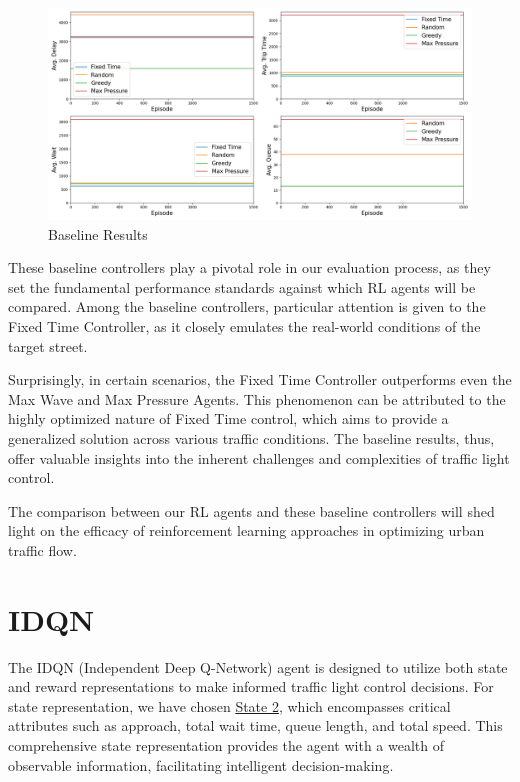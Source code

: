 \begin{figure}[h]
    \centering
    \includegraphics[width=1\linewidth]{images/experiments/baseline.png}
    \caption{Baseline Results}
    \label{fig:baseline_results}
\end{figure}

These baseline controllers play a pivotal role in our evaluation process, as they set the fundamental performance standards against which RL agents will be compared. Among the baseline controllers, particular attention is given to the Fixed Time Controller, as it closely emulates the real-world conditions of the target street.

Surprisingly, in certain scenarios, the Fixed Time Controller outperforms even the Max Wave and Max Pressure Agents. This phenomenon can be attributed to the highly optimized nature of Fixed Time control, which aims to provide a generalized solution across various traffic conditions. The baseline results, thus, offer valuable insights into the inherent challenges and complexities of traffic light control.

The comparison between our RL agents and these baseline controllers will shed light on the efficacy of reinforcement learning approaches in optimizing urban traffic flow.

\section{IDQN} \label{sec:exp-idqn}
The IDQN (Independent Deep Q-Network) agent is designed to utilize both state and reward representations to make informed traffic light control decisions. For state representation, we have chosen \hyperref[subsec:state-2]{State 2}, which encompasses critical attributes such as approach, total wait time, queue length, and total speed. This comprehensive state representation provides the agent with a wealth of observable information, facilitating intelligent decision-making.

